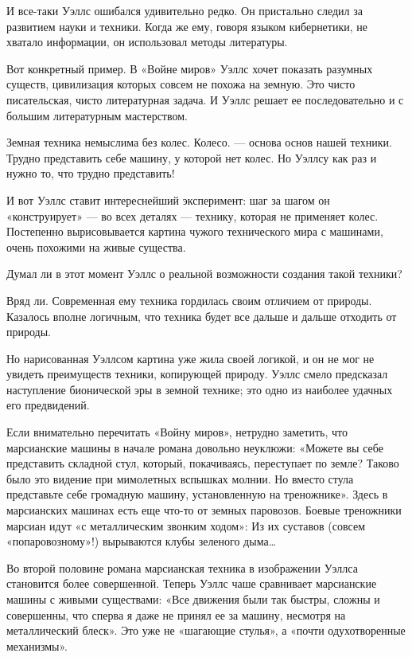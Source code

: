 И все-таки  Уэллс  ошибался удивительно  редко.  Он пристально  следил  за
развитием науки и  техники. Когда  же ему, говоря  языком кибернетики,  не
хватало информации, он использовал методы литературы.

Вот конкретный  пример.  В «Войне  миров»  Уэллс хочет  показать  разумных
существ, цивилизация  которых  совсем  не  похожа  на  земную.  Это  чисто
писательская, чисто литературная задача. И Уэллс решает ее последовательно
и с большим литературным мастерством.

Земная техника немыслима без колес. Колесо. — основа основ нашей  техники.
Трудно представить себе машину, у которой  нет колес. Но Уэллсу как раз  и
нужно то, что трудно представить!

И  вот  Уэллс   ставит  интереснейший   эксперимент:  шаг   за  шагом   он
«конструирует» — во всех  деталях — технику,  которая не применяет  колес.
Постепенно вырисовывается  картина чужого  технического мира  с  машинами,
очень похожими на живые существа.

Думал ли  в  этот  момент  Уэллс о  реальной  возможности  создания  такой
техники?

Вряд ли.  Современная ему  техника гордилась  своим отличием  от  природы.
Казалось вполне логичным, что техника  будет все дальше и дальше  отходить
от природы.

Но нарисованная Уэллсом  картина уже жила  своей логикой, и  он не мог  не
увидеть преимуществ техники,  копирующей природу.  Уэллс смело  предсказал
наступление бионической эры в земной технике; это одно из наиболее удачных
его предвидений.

Если  внимательно  перечитать  «Войну   миров»,  нетрудно  заметить,   что
марсианские машины  в начале  романа довольно  неуклюжи: «Можете  вы  себе
представить складной  стул, который,  покачиваясь, переступает  по  земле?
Таково было это видение  при мимолетных вспышках  молнии. Но вместо  стула
представьте себе громадную машину,  установленную на треножнике». Здесь  в
марсианских машинах есть еще что-то от земных паровозов. Боевые треножники
марсиан идут  «с  металлическим звонким  ходом»:  Из их  суставов  (совсем
«попаровозному»!) вырываются клубы зеленого дыма…

Во  второй  половине  романа  марсианская  техника  в  изображении  Уэллса
становится более  совершенной. Теперь  Уэллс чаше  сравнивает  марсианские
машины с  живыми  существами: «Все  движения  были так  быстры,  сложны  и
совершенны, что  сперва  я  даже  не принял  ее  за  машину,  несмотря  на
металлический  блеск».   Это   уже   не  «шагающие   стулья»,   а   «почти
одухотворенные механизмы».

